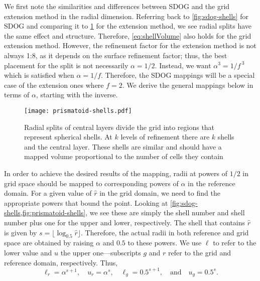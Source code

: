 We first note the similarities and differences between SDOG and the grid extension method in the radial dimension.
Referring back to \cref{fig:sdog-shells} for SDOG and comparing it to \cref{fig:prismatoid-shells} for the extension method, we see radial splits have the same effect and structure.
Therefore, \cref{eq:shellVolume} also holds for the grid extension method.
However, the refinement factor for the extension method is not always 1:8, as it depends on the surface refinement factor; thus, the best placement for the split is not necessarily $\alpha = 1/2$.
Instead, we want $\alpha^3 = 1 / f^{\ 3}$ which is satisfied when $\alpha = 1/f$.
Therefore, the SDOG mappings will be a special case of the extension ones where $f = 2$.
We derive the general mappings below in terms of $\alpha$, starting with the inverse.


\begin{figure}[ht!]
	\centering
	\texttt{[image: prismatoid-shells.pdf]}
	\caption[Spherical shells that result from the grid extension method]{
		Radial splits of central layers divide the grid into regions that represent spherical shells.
		At $k$ levels of refinement there are $k$ shells and the central layer.
		These shells are similar and should have a mapped volume proportional to the number of cells they contain
	}
	\label{fig:prismatoid-shells}
\end{figure}

In order to achieve the desired results of the mapping, radii at powers of $1/2$ in grid space should be mapped to corresponding powers of $\alpha$ in the reference domain.
For a given value of $\hat{r}$ in the grid domain, we need to find the appropriate powers that bound the point.
Looking at \cref{fig:sdog-shells,fig:prismatoid-shells}, we see these are simply the shell number and shell number plus one for the upper and lower, respectively.
The shell that contains $\hat{r}$ is given by $s = \lfloor \log_{0.5} \hat{r} \rfloor$.
Therefore, the actual radii in both reference and grid space are obtained by raising $\alpha$ and $0.5$ to these powers.
We use $\ell$ to refer to the lower value and $u$ the upper one---subscripts $g$ and $r$ refer to the grid and reference domain, respectively.
Thus,
%
\begin{equation*}
\ell_r = \alpha^{s + 1}, \quad u_r = \alpha^s, \quad \ell_g = 0.5^{s + 1}, \quad \text{and} \quad u_g = 0.5^s.
\end{equation*}
%

